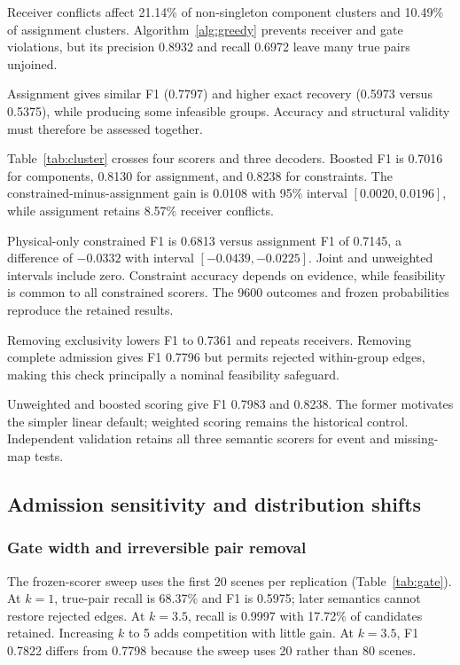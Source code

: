 Receiver conflicts affect 21.14\% of non-singleton component clusters and 10.49\% of assignment clusters. Algorithm~\ref{alg:greedy} prevents receiver and gate violations, but its precision 0.8932 and recall 0.6972 leave many true pairs unjoined.

Assignment gives similar F1 (0.7797) and higher exact recovery (0.5973 versus 0.5375), while producing some infeasible groups. Accuracy and structural validity must therefore be assessed together.

Table~\ref{tab:cluster} crosses four scorers and three decoders. Boosted F1 is 0.7016 for components, 0.8130 for assignment, and 0.8238 for constraints. The constrained-minus-assignment gain is 0.0108 with 95\% interval $[0.0020,0.0196]$, while assignment retains 8.57\% receiver conflicts.

Physical-only constrained F1 is 0.6813 versus assignment F1 of 0.7145, a difference of $-0.0332$ with interval $[-0.0439,-0.0225]$. Joint and unweighted intervals include zero. Constraint accuracy depends on evidence, while feasibility is common to all constrained scorers. The 9600 outcomes and frozen probabilities reproduce the retained results.

Removing exclusivity lowers F1 to 0.7361 and repeats receivers. Removing complete admission gives F1 0.7796 but permits rejected within-group edges, making this check principally a nominal feasibility safeguard.

Unweighted and boosted scoring give F1 0.7983 and 0.8238. The former motivates the simpler linear default; weighted scoring remains the historical control. Independent validation retains all three semantic scorers for event and missing-map tests.

\subsection{Admission sensitivity and distribution shifts}
\subsubsection{Gate width and irreversible pair removal}
The frozen-scorer sweep uses the first 20 scenes per replication (Table~\ref{tab:gate}). At $k=1$, true-pair recall is 68.37\% and F1 is 0.5975; later semantics cannot restore rejected edges. At $k=3.5$, recall is 0.9997 with 17.72\% of candidates retained. Increasing $k$ to 5 adds competition with little gain. At $k=3.5$, F1 0.7822 differs from 0.7798 because the sweep uses 20 rather than 80 scenes.

